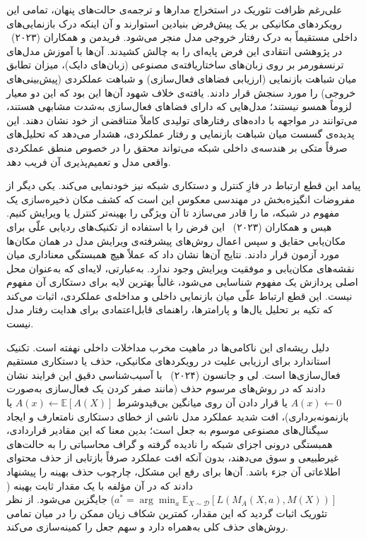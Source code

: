 علی‌رغم ظرافت تئوریک در استخراج مدارها و ترجمه‌ی حالت‌های پنهان، تمامی این رویکردهای مکانیکی بر یک پیش‌فرض بنیادین استوارند و آن اینکه درک بازنمایی‌های داخلی مستقیماً به درک رفتار خروجی مدل منجر می‌شود. فریدمن و همکاران (۲۰۲۳)~\cite{friedman2023comparing} در پژوهشی انتقادی این فرض پایه‌ای را به چالش کشیدند. آن‌ها با آموزش مدل‌های ترنسفورمر بر روی زبان‌های ساختاریافته‌ی مصنوعی (زبان‌های دایک)، میزان تطابق میان شباهت بازنمایی (ارزیابی فضاهای فعال‌سازی) و شباهت عملکردی (پیش‌بینی‌های خروجی) را مورد سنجش قرار دادند. یافته‌ی خلاف شهود آن‌ها این بود که این دو معیار لزوماً همسو نیستند؛ مدل‌هایی که دارای فضاهای فعال‌سازی به‌شدت مشابهی هستند، می‌توانند در مواجهه با داده‌های  رفتارهای تولیدی کاملاً متناقضی از خود نشان دهند. این پدیده‌ی گسست میان شباهت بازنمایی و رفتار عملکردی، هشدار می‌دهد که تحلیل‌های صرفاً متکی بر هندسه‌ی داخلی شبکه می‌تواند محقق را در خصوص منطق عملکردی واقعی مدل و تعمیم‌پذیری آن فریب دهد.

پیامد این قطع ارتباط در فازِ کنترل و دستکاری شبکه نیز خودنمایی می‌کند. یکی دیگر از مفروضات انگیزه‌بخش در مهندسی معکوس این است که کشف مکان ذخیره‌سازی یک مفهوم در شبکه، ما را قادر می‌سازد تا آن ویژگی را بهینه‌تر کنترل یا ویرایش کنیم. هیس و همکاران (۲۰۲۳)~\cite{hase2023does} این فرض را با استفاده از تکنیک‌های ردیابی علّی برای مکان‌یابی حقایق و سپس اعمال روش‌های پیشرفته‌ی ویرایش مدل در همان مکان‌ها مورد آزمون قرار دادند. نتایج آن‌ها نشان داد که عملاً هیچ همبستگی معناداری میان نقشه‌های مکان‌یابی و موفقیت ویرایش وجود ندارد. به‌عبارتی، لایه‌ای که به‌عنوان محل اصلی پردازش یک مفهوم شناسایی می‌شود، غالباً بهترین لایه برای دستکاری آن مفهوم نیست. این قطع ارتباط علّی میان بازنمایی داخلی و مداخله‌ی عملکردی، اثبات می‌کند که تکیه بر تحلیل یال‌ها و پارامترها، راهنمای قابل‌اعتمادی برای هدایت رفتار مدل نیست.

دلیل ریشه‌ای این ناکامی‌ها در ماهیت مخرب مداخلات داخلی نهفته است. تکنیک استاندارد برای ارزیابی علیت در رویکردهای مکانیکی، حذف یا دستکاری مستقیم فعال‌سازی‌ها است. لی و جانسون (۲۰۲۴)~\cite{li2024optimal} با آسیب‌شناسی دقیق این فرایند نشان دادند که در روش‌های مرسوم حذف (مانند صفر کردن یک فعال‌سازی به‌صورت $A(x) \leftarrow 0$ یا قرار دادن آن روی میانگین بی‌قیدوشرط $A(x) \leftarrow \mathbb{E}[A(X)]$ یا بازنمونه‌برداری)، افت شدید عملکرد مدل ناشی از خطای دستکاری نامتعارف و ایجاد سیگنال‌های مصنوعی موسوم به جعل است؛ بدین معنا که این مقادیر قراردادی، همبستگی درونی اجزای شبکه را نادیده گرفته و گراف محاسباتی را به حالت‌های غیرطبیعی و  سوق می‌دهند، بدون آنکه افت عملکرد صرفاً بازتابی از حذف محتوای اطلاعاتی آن جزء باشد. آن‌ها برای رفع این مشکل، چارچوب حذف بهینه را پیشنهاد دادند که در آن مؤلفه با یک مقدار ثابت بهینه ($a^* = \arg\min_a \mathbb{E}_{X \sim \mathcal{D}} [L(M_A(X, a), M(X))]$) جایگزین می‌شود. از نظر تئوریک اثبات گردید که این مقدار، کمترین شکاف زیان ممکن را در میان تمامی روش‌های حذف کلی به‌همراه دارد و سهم جعل را کمینه‌سازی می‌کند.

